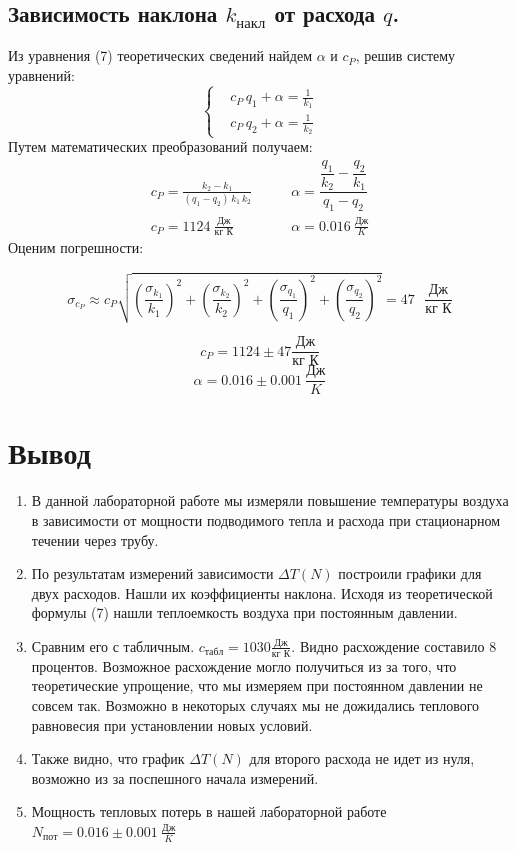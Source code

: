 \documentclass[a4paper,12pt]{article}
\begin{document}
\newpage

\subsection*{Зависимость наклона $k_{накл}$ от расхода $q$.}

Из уравнения (7) теоретических сведений найдем $\alpha$ и $c_P$, решив систему уравнений:
\[
	\left\{
		\begin{aligned}
			& c_P\, q_1 + \alpha = \frac{1}{k_1} \\
			& c_P\, q_2 + \alpha = \frac{1}{k_2}
		\end{aligned}
	\right.
\]
Путем математических преобразований получаем:
\[
\begin{aligned}
	 c_P = \frac{k_2 - k_1}{(q_1 - q_2)\, k_1\, k_2} & \qquad  \alpha = \dfrac{\dfrac{q_1}{k_2} - \dfrac{q_2}{k_1}}{q_1 - q_2} \\
	 c_P = 1124\ \frac{\text{Дж}}{\text{кг К}} & \qquad  \alpha = 0.016\ \frac{\text{Дж}}{K} 
\end{aligned}
\]
Оценим погрешности:

\[
	\sigma_{c_P} \approx c_P \sqrt{\left(\frac{\sigma_{k_1}}{k_1}\right)^2 + \left(\frac{\sigma_{k_2}}{k_2}\right)^2 + \left(\frac{\sigma_{q_1}}{q_1}\right)^2 + \left(\frac{\sigma_{q_2}}{q_2}\right)^2} = 47 \text{ } \frac{\text{Дж}}{\text{кг К}}
\]

\[ c_P  =   1124 \pm 47 \dfrac{\text{Дж}}{\text{кг К}} \] 
\[ \alpha = 0.016\pm 0.001\ \frac{\text{Дж}}{K} \] 

\section{Вывод}
\begin{enumerate}
    \item В данной лабораторной работе мы измеряли повышение температуры воздуха в зависимости от мощности подводимого тепла и расхода при стационарном течении через трубу. 
    \item По результатам измерений зависимости $\Delta T(N)$ построили графики для двух расходов. Нашли их коэффициенты наклона. Исходя из теоретической формулы (7) нашли теплоемкость воздуха при постоянным давлении.
    \item Сравним его с табличным. $c_{табл} = 1030 \frac{\text{Дж}}{\text{кг К}} $. Видно расхождение составило 8 процентов. Возможное расхождение могло получиться из за того, что теоретические упрощение, что мы измеряем при постоянном давлении не совсем так. Возможно в некоторых случаях мы не дожидались теплового равновесия при установлении новых условий. 
    \item Также видно, что график $\Delta T (N)$ для второго расхода не идет из нуля, возможно из за поспешного начала измерений.
    \item Мощность тепловых потерь в нашей лабораторной работе $N_{пот} = 0.016\pm 0.001\ \frac{\text{Дж}}{K}$
\end{enumerate}
\end{document}
